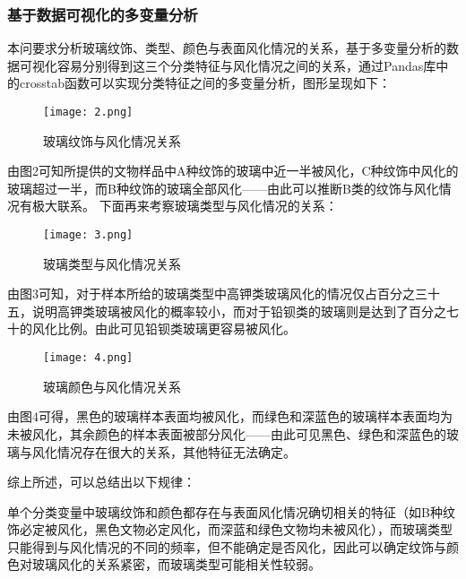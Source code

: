 \subsubsection{基于数据可视化的多变量分析}

本问要求分析玻璃纹饰、类型、颜色与表面风化情况的关系，基于多变量分析的数据可视化容易分别得到这三个分类特征与风化情况之间的关系，通过Pandas库中的crosstab函数可以实现分类特征之间的多变量分析，图形呈现如下：

\begin{figure}[H] 
	\centering %
	\texttt{[image: 2.png]} %
	\caption{玻璃纹饰与风化情况关系} %
	\label{Fig.main3} %
\end{figure}

由图2可知所提供的文物样品中A种纹饰的玻璃中近一半被风化，C种纹饰中风化的玻璃超过一半，而B种纹饰的玻璃全部风化——由此可以推断B类的纹饰与风化情况有极大联系。
下面再来考察玻璃类型与风化情况的关系：

\begin{figure}[H] 
	\centering %
	\texttt{[image: 3.png]} %
	\caption{玻璃类型与风化情况关系} %
	\label{Fig.main4} %
\end{figure}

由图3可知，对于样本所给的玻璃类型中高钾类玻璃风化的情况仅占百分之三十五，说明高钾类玻璃被风化的概率较小，而对于铅钡类的玻璃则是达到了百分之七十的风化比例。由此可见铅钡类玻璃更容易被风化。

\begin{figure}[H] 
	\centering %
	\texttt{[image: 4.png]} %
	\caption{玻璃颜色与风化情况关系} %
	\label{Fig.main5} %
\end{figure}

由图4可得，黑色的玻璃样本表面均被风化，而绿色和深蓝色的玻璃样本表面均为未被风化，其余颜色的样本表面被部分风化——由此可见黑色、绿色和深蓝色的玻璃与风化情况存在很大的关系，其他特征无法确定。

综上所述，可以总结出以下规律：

单个分类变量中玻璃纹饰和颜色都存在与表面风化情况确切相关的特征（如B种纹饰必定被风化，黑色文物必定风化，而深蓝和绿色文物均未被风化），而玻璃类型只能得到与风化情况的不同的频率，但不能确定是否风化，因此可以确定纹饰与颜色对玻璃风化的关系紧密，而玻璃类型可能相关性较弱。

